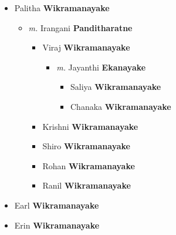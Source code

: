 \documentclass[10pt, openany]{book}
\begin{document}
\begin{itemize}
{\begin{itemize}
{\begin{itemize}
{\begin{itemize}
{\begin{itemize}
{\begin{itemize}
{\begin{itemize}
{\begin{itemize}
{ }
\end{itemize}}
\end{itemize}
  }
\end{itemize}}
\end{itemize}
  }
\end{itemize}}
\end{itemize}
 }
\item{Palitha \textbf{Wikramanayake} \textcolor{slorange}{\textit{}}
\begin{itemize}
\item{\textit{m.} Irangani \textbf{Panditharatne} \textcolor{slorange}{\textit{}}   \label{couple:00004068:00004069} \begin{itemize}
\item{Viraj \textbf{Wikramanayake} \textcolor{slorange}{\textit{}}
\begin{itemize}
\item{\textit{m.} Jayanthi \textbf{Ekanayake} \textcolor{slorange}{\textit{}}   \label{couple:00004070:00004071} \begin{itemize}
\item{Saliya \textbf{Wikramanayake} \textcolor{slorange}{\textit{}}
 }
\item{Chanaka \textbf{Wikramanayake} \textcolor{slorange}{\textit{}}
 }
\end{itemize}}
\end{itemize}
 }
\item{Krishni \textbf{Wikramanayake} \textcolor{slorange}{\textit{}}
 }
\item{Shiro \textbf{Wikramanayake} \textcolor{slorange}{\textit{}}
 }
\item{Rohan \textbf{Wikramanayake} \textcolor{slorange}{\textit{}}
 }
\item{Ranil \textbf{Wikramanayake} \textcolor{slorange}{\textit{}}
 }
\end{itemize}}
\end{itemize}
 }
\item{Earl \textbf{Wikramanayake} \textcolor{slorange}{\textit{}}
 }
\item{Erin \textbf{Wikramanayake} \textcolor{slorange}{\textit{}}
}
\end{itemize}}
\end{itemize}
\end{document}
